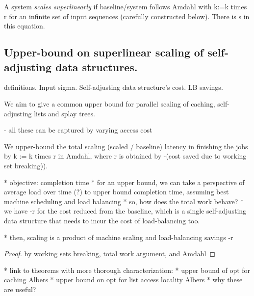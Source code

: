 






A system \emph{scales superlinearly} if baseline/system follows Amdahl with k:=k times r for an infinite set of input sequences (carefully constructed below). There is s in this equation.




\subsection{Upper-bound on superlinear scaling of self-adjusting data structures.}

definitions.
Input sigma.
Self-adjusting data structure's cost.
LB savings.

We aim to give a common upper bound for parallel scaling of caching, self-adjusting lists and splay trees.

- all these can be captured by varying access cost



\begin{theorem}
 We upper-bound the total scaling (scaled / baseline) latency in finishing the jobs by k := k times r in Amdahl, where r is obtained by -(cost saved due to working set breaking)).

* objective: completion time
* for an upper bound, we can take a perspective of average load over time (?) to upper bound completion time, assuming best machine scheduling and load balancing
* so, how does the total work behave?
    * we have -r for the cost reduced from the baseline, which is a single self-adjusting data structure that needs to incur the cost of load-balancing too.

* then, scaling is a product of machine scaling and load-balancing savings -r

 
\end{theorem}

\begin{proof}
  by working sets breaking, total work argument, and Amdahl
\end{proof}

* link to theorems with more thorough characterization:
    * upper bound of opt for caching Albers
    * upper bound on opt for list access locality Albers
    * why these are useful?


